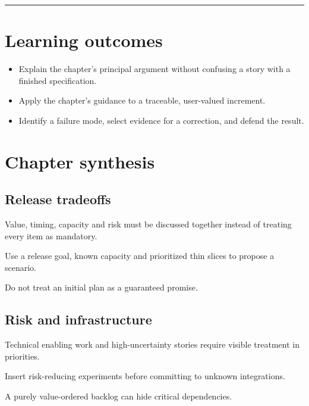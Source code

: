 \documentclass[11pt,letterpaper]{article}
\begin{document}
\tableofcontents\medskip\noindent\rule{\linewidth}{0.4pt}\medskip
\section{Learning outcomes}
\begin{itemize}[leftmargin=*,itemsep=2pt]
\item Explain the chapter's principal argument without confusing a story with a finished specification.
\item Apply the chapter's guidance to a traceable, user-valued increment.
\item Identify a failure mode, select evidence for a correction, and defend the result.
\end{itemize}
\section{Chapter synthesis}
\subsection{Release tradeoffs}
Value, timing, capacity and risk must be discussed together instead of treating every item as mandatory.

\begin{tcolorbox}[colback=tealback,colframe=navy,title={Engineering translation},breakable]
Use a release goal, known capacity and prioritized thin slices to propose a scenario.

\end{tcolorbox}
\begin{tcolorbox}[colback=amberback,colframe=navy,title={Failure mode to watch},breakable]
Do not treat an initial plan as a guaranteed promise.

\end{tcolorbox}
\subsection{Risk and infrastructure}
Technical enabling work and high-uncertainty stories require visible treatment in priorities.

\begin{tcolorbox}[colback=tealback,colframe=navy,title={Engineering translation},breakable]
Insert risk-reducing experiments before committing to unknown integrations.

\end{tcolorbox}
\begin{tcolorbox}[colback=amberback,colframe=navy,title={Failure mode to watch},breakable]
A purely value-ordered backlog can hide critical dependencies.

\end{tcolorbox}
\end{document}
